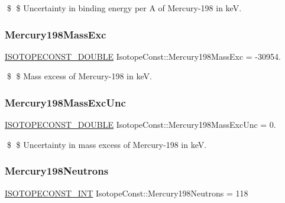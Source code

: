 \$ \$ Uncertainty in binding energy per A of Mercury-\/198 in keV. \mbox{\label{group___isotope_const-_mercury-_hg198_ga3bdd3643ddcd53d09353b7bbf0459bc5}} 
\subsubsection{\texorpdfstring{Mercury198\+Mass\+Exc}{Mercury198MassExc}}
{\footnotesize\ttfamily \mbox{\hyperlink{group___isotope_const-_macros_ga8f45a7272ce02c0b4c65c44636ed719a}{I\+S\+O\+T\+O\+P\+E\+C\+O\+N\+S\+T\+\_\+\+D\+O\+U\+B\+LE}} Isotope\+Const\+::\+Mercury198\+Mass\+Exc = -\/30954.}

\$ \$ Mass excess of Mercury-\/198 in keV. \mbox{\label{group___isotope_const-_mercury-_hg198_gadf3f80f6f09a7de570c0424e45356b7e}} 
\subsubsection{\texorpdfstring{Mercury198\+Mass\+Exc\+Unc}{Mercury198MassExcUnc}}
{\footnotesize\ttfamily \mbox{\hyperlink{group___isotope_const-_macros_ga8f45a7272ce02c0b4c65c44636ed719a}{I\+S\+O\+T\+O\+P\+E\+C\+O\+N\+S\+T\+\_\+\+D\+O\+U\+B\+LE}} Isotope\+Const\+::\+Mercury198\+Mass\+Exc\+Unc = 0.}

\$ \$ Uncertainty in mass excess of Mercury-\/198 in keV. \mbox{\label{group___isotope_const-_mercury-_hg198_gaec39eb80fe1f2061df1e455cb178f3a4}} 
\subsubsection{\texorpdfstring{Mercury198\+Neutrons}{Mercury198Neutrons}}
{\footnotesize\ttfamily \mbox{\hyperlink{group___isotope_const-_macros_ga5f18360b3e99483a35c32d789e62621c}{I\+S\+O\+T\+O\+P\+E\+C\+O\+N\+S\+T\+\_\+\+I\+NT}} Isotope\+Const\+::\+Mercury198\+Neutrons = 118}

